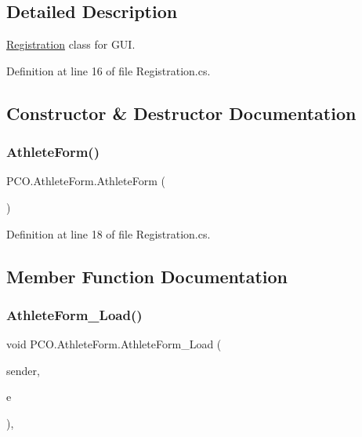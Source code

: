 \subsection{Detailed Description}
\hyperlink{classRegistration}{Registration} class for G\+UI. 

Definition at line 16 of file Registration.\+cs.



\subsection{Constructor \& Destructor Documentation}
\mbox{\label{classPCO_1_1AthleteForm_ac7c2d0e5ed03bbd98d1b5bd9a9245447}} 
\subsubsection{\texorpdfstring{Athlete\+Form()}{AthleteForm()}}
{\footnotesize\ttfamily P\+C\+O.\+Athlete\+Form.\+Athlete\+Form (\begin{DoxyParamCaption}{ }\end{DoxyParamCaption})\hspace{0.3cm}{\ttfamily [inline]}}



Definition at line 18 of file Registration.\+cs.



\subsection{Member Function Documentation}
\mbox{\label{classPCO_1_1AthleteForm_a085dc790d2f36681997fa915c475148c}} 
\subsubsection{\texorpdfstring{Athlete\+Form\+\_\+\+Load()}{AthleteForm\_Load()}}
{\footnotesize\ttfamily void P\+C\+O.\+Athlete\+Form.\+Athlete\+Form\+\_\+\+Load (\begin{DoxyParamCaption}\item[{object}]{sender,  }\item[{Event\+Args}]{e }\end{DoxyParamCaption})\hspace{0.3cm}{\ttfamily [inline]}, {\ttfamily [private]}}



